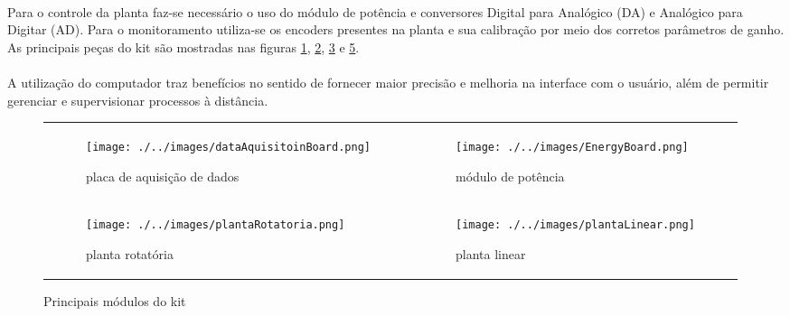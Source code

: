 \documentclass[a4paper,11pt]{article}
\begin{document}
\paragraph{}Para o controle da planta faz-se necessário o uso do módulo de potência e conversores 
Digital para Analógico (DA) e Analógico para Digitar (AD). Para o monitoramento
utiliza-se os encoders presentes na planta e sua calibração por meio dos corretos parâmetros de ganho.
As principais peças do kit são mostradas nas figuras \ref{fig:aquisicao}, \ref{fig:pot_mod}, \ref{fig:planta_rot}
e \ref{fig:planta_lin}.

\paragraph{} A utilização do computador traz benefícios no sentido de fornecer maior precisão e melhoria na interface com o
 usuário, além de permitir gerenciar e supervisionar processos à distância.
\FloatBarrier
\begin{figure}[!htp]
\centering
	\begin{tabular}{ll}
		\begin{subfigure}[!htp]{0.3\textwidth}
			\centering
			\texttt{[image: ./../images/dataAquisitoinBoard.png]}
			\caption{placa de aquisição de dados}
			\label{fig:aquisicao}
		\end{subfigure}		&
		\begin{subfigure}[!htp]{0.3\textwidth}
			\centering
			\texttt{[image: ./../images/EnergyBoard.png]}
			\caption{módulo de potência}
			\label{fig:pot_mod}
		\end{subfigure}		\\
		\begin{subfigure}[!htp]{0.3\textwidth}
			\centering
			\texttt{[image: ./../images/plantaRotatoria.png]}
			\caption{planta rotatória}
			\label{fig:planta_rot}
		\end{subfigure}		&
		\begin{subfigure}[!htp]{0.3\textwidth}
			\centering
			\texttt{[image: ./../images/plantaLinear.png]}
			\caption{planta linear}
			\label{fig:planta_lin}
		\end{subfigure}		\\
	\end{tabular}	
\caption{Principais módulos do kit}
\end{figure}
\FloatBarrier

\newpage
\end{document}
